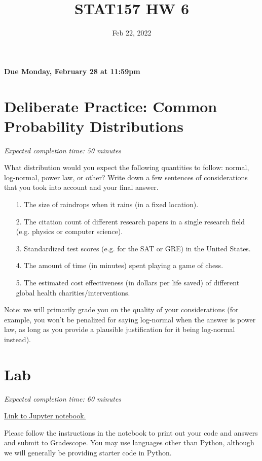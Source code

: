 \documentclass[11pt]{article}
\title{STAT157 HW 6}
\date{Feb 22, 2022}
\begin{document}
\maketitle

\hfill \textbf{Due Monday, February 28 at 11:59pm}

\section*{Deliberate Practice: Common Probability Distributions}

\emph{Expected completion time: 50 minutes}

What distribution would you expect the following quantities to follow: normal, log-normal, power law, or other? Write down a few sentences of considerations that you took into account and your final answer. 

\begin{enumerate}
	\item[1.] The size of raindrops when it rains (in a fixed location).
	\item[2.] The citation count of different research papers in a single research field (e.g. physics or computer science).
	\item[3.] Standardized test scores (e.g. for the SAT or GRE) in the United States.
	\item[4.] The amount of time (in minutes) spent playing a game of chess.
	\item[5.] The estimated cost effectiveness (in dollars per life saved) of different global health charities/interventions.
\end{enumerate}

Note: we will primarily grade you on the quality of your considerations (for example, you won't be penalized for saying log-normal when the answer is power law, as long as you provide a plausible justification for it being log-normal instead).

\section*{Lab}

\emph{Expected completion time: 60 minutes}

\href{https://datahub.berkeley.edu/hub/user-redirect/git-pull?repo=https%3A%2F%2Fgithub.com%2Fjs-d%2Fstat-157-260-website&urlpath=tree%2Fstat-157-260-website%2Fhw%2Fhw6%2Fhw6lab.ipynb&branch=main}{Link to Jupyter notebook.}

Please follow the instructions in the notebook to print out your code and answers and submit to Gradescope. You may use languages other than Python, although we will generally be providing starter code in Python.
\end{document}
